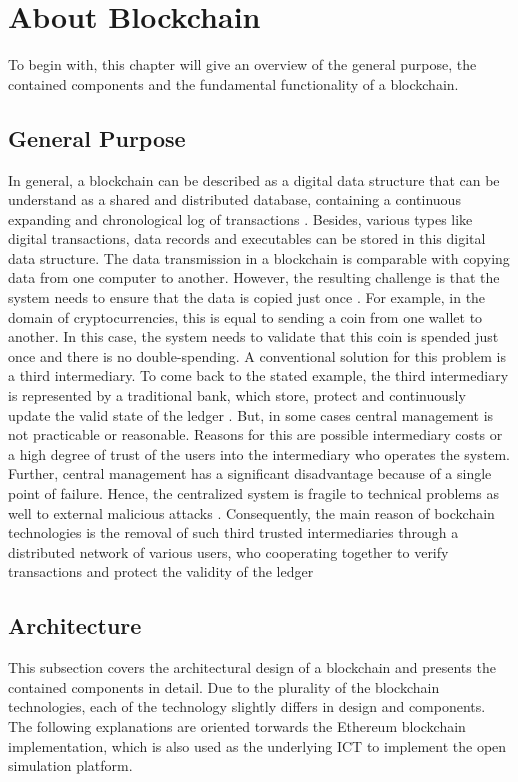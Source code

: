 \section{About Blockchain}

To begin with, this chapter will give an overview of the general purpose, the contained components and the fundamental functionality of a blockchain. 

\subsection{General Purpose}
In general, a blockchain can be described as a digital data structure that can be understand as a shared and distributed database, containing a continuous expanding and chronological log of transactions . Besides, various types like digital transactions, data records and executables can be stored in this digital data structure. The data transmission in a blockchain is comparable with copying data from one computer to another. However, the resulting challenge is that the system needs to ensure that the data is copied just once . For example, in the domain of cryptocurrencies, this is equal to sending a coin from one wallet to another. In this case, the system needs to validate that this coin is spended just once and there is no double-spending. A conventional solution for this problem is a third intermediary. To come back to the stated example, the third intermediary is represented by a traditional bank, which store, protect and continuously update the valid state of the ledger . But, in some cases central management is not practicable or reasonable. Reasons for this are possible intermediary costs or a high degree of trust of the users into the intermediary who operates the system. Further, central management has a significant disadvantage because of a single point of failure. Hence, the centralized system is fragile to technical problems as well to external malicious attacks .
Consequently, the main reason of bockchain technologies is the removal of such third trusted intermediaries through a distributed network of various users, who cooperating together to verify transactions and protect the validity of the ledger

\subsection{Architecture}
This subsection covers the architectural design of a blockchain and presents the contained components in detail. Due to the plurality of the blockchain technologies, each of the technology slightly differs in design and components. The following explanations are oriented torwards the Ethereum blockchain implementation, which is also used as the underlying ICT to implement the open simulation platform.

